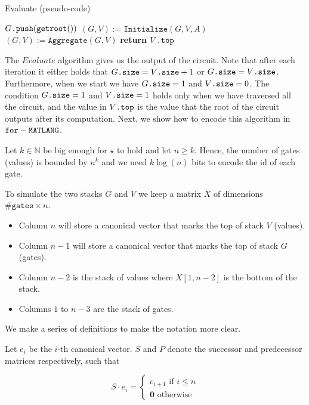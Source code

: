 \begin{algorithm}
\caption{Evaluate (pseudo-code)}\label{alg:eval_code}
\begin{algorithmic}[1]
	\State $G\texttt{.push}(\texttt{getroot}())$
			\State $(G,V) := \texttt{Initialize}(G,V,A)$
		\Else
			\State $(G,V):= \texttt{Aggregate}(G,V)$
		\EndIf
	\EndWhile
	\State \textbf{return} $V\texttt{.top}$
\EndFunction
\end{algorithmic}
\end{algorithm}

The $Evaluate$ algorithm gives us the output of the circuit. Note that after each iteration it either holds that $G\texttt{.size} =  V\texttt{.size} + 1$ or $G\texttt{.size} =  V\texttt{.size}$. Furthermore, when we start we have $G\texttt{.size}=1$ and $V\texttt{.size}=0$. The condition $G\texttt{.size}= 1$ and $V\texttt{.size}=1$ holds only when we have traversed all the circuit, and the value in $V\texttt{.top}$ is the value that the root of the circuit outputs after its computation. Next, we show how to encode this algorithm in $\texttt{for}-\texttt{MATLANG}$.

Let $k\in\mathbb{N}$ be big enough for $\star$ to hold and let $n\geq k$. Hence, the number of gates (values) is bounded by $n^k$ and we need $k\log (n)$ bits to encode the id of each gate.

To simulate the two stacks $G$ and $V$ we keep a matrix $X$ of dimensions $\texttt{\#gates} \times n$.

\begin{itemize}
	\item Column $n$ will store a canonical vector that marks the top of stack $V$ (values).
	\item Column $n-1$ will store a canonical vector that marks the top of stack $G$ (gates).
	\item Column $n-2$ is the stack of values where $X[1, n-2]$ is the bottom of the stack.
	\item Columns $1$ to $n-3$ are the stack of gates.
\end{itemize}

We make a series of definitions to make the notation more clear.

Let $e_i$ be the $i$-th canonical vector. $S$ and $P$ denote the successor and predecessor matrices respectively, such that

\[
  			S\cdot e_i=\begin{cases}
               e_{i+1} \text{ if } i\leq n \\
               \mathbf{0} \text{ otherwise }
            \end{cases}
\]

